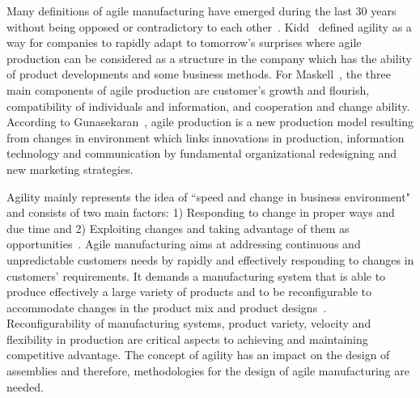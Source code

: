 \documentclass[final,12pt]{elsarticle}
\begin{document}
Many definitions of agile manufacturing have emerged during the last 30 years without being opposed or contradictory to each other~\cite{Dahmardeh.2010}. Kidd~\cite{KIDD.2000} defined agility as a way for companies to rapidly adapt to tomorrow's surprises where agile production can be considered as a structure in the company which has the ability of product developments and some business methods. For Maskell~\cite{Maskell.2001}, the three main components of agile production are customer's growth and flourish, compatibility of individuals and information, and cooperation and change ability. According to Gunasekaran~\cite{GUNASEKARAN.1999}, agile production is a new production model resulting from changes in environment which links innovations in production, information technology and communication by fundamental organizational redesigning and new marketing strategies.

Agility mainly represents the idea of ``speed and change in business environment" and consists of two main factors: 1) Responding to change in proper ways and due time and 2) Exploiting changes and taking advantage of them as opportunities~\cite{SHARIFI.1999}. Agile manufacturing aims at addressing continuous and unpredictable customers needs by rapidly and effectively responding to changes in customers' requirements. It demands a manufacturing system that is able to produce effectively a large variety of products and to be reconfigurable to accommodate changes in the product mix and product designs~\cite{GUNASEKARAN.1999}. Reconfigurability of manufacturing systems, product variety, velocity and flexibility in production are critical aspects to achieving and maintaining competitive advantage. The concept of agility has an impact on the design of assemblies and therefore, methodologies for the design of agile manufacturing are needed.
\end{document}
